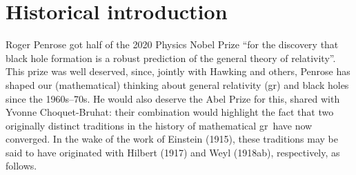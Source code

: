 \documentclass[11pt,a4paper]{article}
\newcommand{\GR}{{\sc gr}}
\begin{document}
\thispagestyle{empty}
\renewcommand{\thefootnote}{\arabic{footnote}}
\newpage \setcounter{footnote}{0}
\section{Historical introduction}\label{HI}
Roger Penrose got half of the 2020 Physics Nobel Prize ``for the discovery that black hole formation is a robust prediction of the general theory of relativity''. This prize was well deserved, since, jointly with Hawking and others, Penrose  has shaped our (mathematical) thinking about general relativity (\GR) and black holes since the 1960s--70s. He would also deserve the Abel Prize for this,  shared with Yvonne Choquet-Bruhat: their combination would  highlight the fact that two originally distinct traditions in the history of mathematical \GR\ have now converged. In the wake of the work of Einstein (1915), these traditions may be said to have originated with Hilbert (1917) and Weyl (1918ab), respectively, as follows. 
\end{document}

